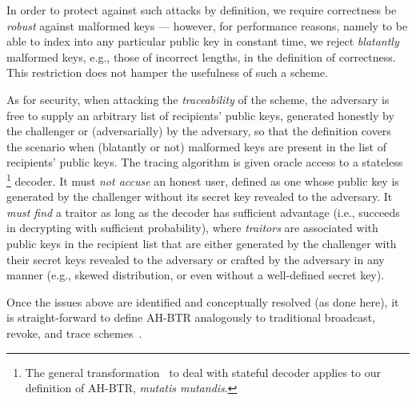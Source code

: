 In order to protect against such attacks by definition,
we require correctness be \emph{robust} against malformed keys ---
however, for performance reasons, namely to be able to index into any particular public key in constant time,
we reject \emph{blatantly} malformed keys, e.g., those of incorrect lengths, in the definition of correctness.
This restriction does not hamper the usefulness of such a scheme.

As for security,
when attacking the \emph{traceability} of the scheme, the adversary is free to supply an arbitrary list of recipients' public keys, generated honestly by the challenger or (adversarially) by the adversary, so that the definition covers the scenario when (blatantly or not) malformed keys are present in the list of recipients' public keys.
The tracing algorithm is given oracle access to a stateless%
\footnote{The general transformation~\cite{DRM:KiaYun01,EC:BonSahWat06} to deal with stateful decoder applies to our definition of AH-BTR, \textit{mutatis mutandis}.}
decoder.
It must \emph{not accuse} an honest user, defined as one whose public key is generated by the challenger without its secret key revealed to the adversary.
It \emph{must find} a traitor as long as the decoder has sufficient advantage (i.e., succeeds in decrypting with sufficient probability), where \emph{traitors} are associated with public keys in the recipient list that are either generated by the challenger with their secret keys revealed to the adversary or crafted by the adversary in any manner (e.g., skewed distribution, or even without a well-defined secret key).

Once the issues above are identified and conceptually resolved (as done here),
it is straight-forward to define AH-BTR analogously to traditional broadcast, revoke, and trace schemes~\cite{FC:NaoPin00,C:NaoNaoLot01,C:GQWW19}.
